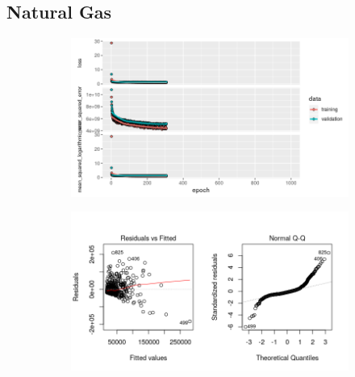 \subsection{Natural Gas}
\label{appendix_nn:natural_gas:nn_full}
\begin{figure}[h]
\begin{subfigure}{1\textwidth}
\centering
\includegraphics[width=.99\textwidth, height=0.4\textheight]{Images/natural_gas_psf_nn_full_train_results.png}
\end{subfigure}
\begin{subfigure}{1\textwidth}
\centering
\includegraphics[width=.99\textwidth, height=0.3\textheight]{Images/natural_gas_psf_nn_full_resid_1.png}
\end{subfigure}
\end{figure}
\newpage
